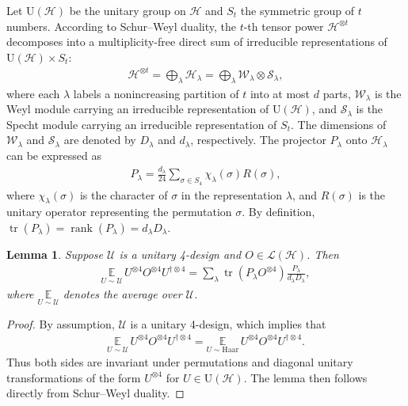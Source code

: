 \documentclass[aps,pra,twocolumn,nofootinbib,superscriptaddress,10pt]{revtex4-2}
\newtheorem{lemma}{Lemma}
\DeclareMathOperator{\tr}{tr}
\DeclareMathOperator{\rk}{rank}
\newcommand{\bbE}{\mathbb{E}}
\newcommand{\caH}{\mathcal{H}}
\newcommand{\caL}{\mathcal{L}}
\newcommand{\caS}{\mathcal{S}}
\newcommand{\caU}{\mathcal{U}}
\newcommand{\caW}{\mathcal{W}}
\newcommand{\rmU}{\mathrm{U}}
\begin{document}
Let $\rmU(\caH)$ be the unitary group on $\caH$ and $S_t$ the symmetric group of $t$ numbers. 
According to Schur--Weyl duality, the $t$-th tensor power $\caH^{\otimes t}$ decomposes into a multiplicity-free direct sum of irreducible representations of $\rmU(\caH) \times S_t$:
\begin{align}
    \caH^{\otimes t}=\bigoplus_\lambda \caH_\lambda=\bigoplus_\lambda \caW_\lambda\otimes \caS_\lambda,
\end{align}
where each $\lambda$ labels a nonincreasing partition of $t$ into at most $d$ parts, $\caW_\lambda$ is the Weyl module carrying an irreducible representation of $\rmU(\caH)$, and $\caS_\lambda$ is the Specht module carrying an irreducible representation of $S_t$. The dimensions of $\caW_\lambda$ and $\caS_\lambda$ are denoted by $D_\lambda$ and $d_\lambda$, respectively. The projector $P_{\lambda}$ onto $\caH_\lambda$ can be expressed as
\begin{align}
    P_{\lambda}=\frac{d_\lambda}{24}\sum_{\sigma\in S_4}\chi_\lambda(\sigma)R(\sigma), \label{eq:Plambda}
\end{align}
where $\chi_\lambda(\sigma)$ is the character of $\sigma$ in the representation $\lambda$, and $R(\sigma)$ is the unitary operator representing the permutation $\sigma$. By definition, $\tr(P_\lambda)=\rk(P_\lambda)=d_\lambda D_\lambda$.

\begin{lemma}
\label{lem:4th_moment}
Suppose $\caU$ is a unitary 4-design and $O \in \caL(\caH)$. Then
\begin{align}
    \underset{U\sim\caU}{\bbE}\, U^{\otimes 4} O^{\otimes 4} U^{\dagger \otimes 4}=\sum_{\lambda}\tr\left( P_{\lambda} O^{\otimes 4}\right)\frac{P_\lambda}{d_\lambda D_\lambda},
\end{align}
where $\underset{U\sim\caU}{\bbE}$ denotes the average over $\caU$.
\end{lemma}
\begin{proof}
By assumption, $\caU$ is a unitary 4-design, which implies that
\begin{align}
\underset{U\sim\caU}{\bbE}\, U^{\otimes 4} O^{\otimes 4} U^{\dagger \otimes 4}=\underset{U\sim \mathrm{Haar}}{\bbE}\, U^{\otimes 4} O^{\otimes 4} U^{\dagger \otimes 4}.
\end{align}
Thus both sides are invariant under permutations and diagonal unitary transformations of the form $U^{\otimes 4}$ for $U\in \rmU(\caH)$. The lemma then follows directly from Schur--Weyl duality.
\end{proof}
\end{document}
